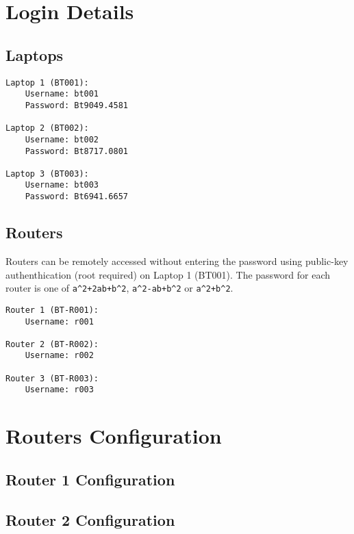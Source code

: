 \appendix

\begingroup

\chapter{Login Details}
\label{app:login}

\section{Laptops}

\begin{lstlisting}
Laptop 1 (BT001):
	Username: bt001
	Password: Bt9049.4581

Laptop 2 (BT002):
	Username: bt002
	Password: Bt8717.0801

Laptop 3 (BT003):
	Username: bt003
	Password: Bt6941.6657
\end{lstlisting}

\section{Routers}

Routers can be remotely accessed without entering the password using public-key authenthication (root required) on Laptop 1 (BT001).
The password for each router is one of \texttt{a\^{}2+2ab+b\^{}2}, \texttt{a\^{}2-ab+b\^{}2} or \texttt{a\^{}2+b\^{}2}.

\begin{lstlisting}
Router 1 (BT-R001):
	Username: r001

Router 2 (BT-R002):
	Username: r002

Router 3 (BT-R003):
	Username: r003
\end{lstlisting}


\chapter{Routers Configuration}
\label{app:routers}

\section{Router 1 Configuration}
\label{app:sec:router1}


\clearpage

\section{Router 2 Configuration}
\label{app:sec:router2}

\clearpage


